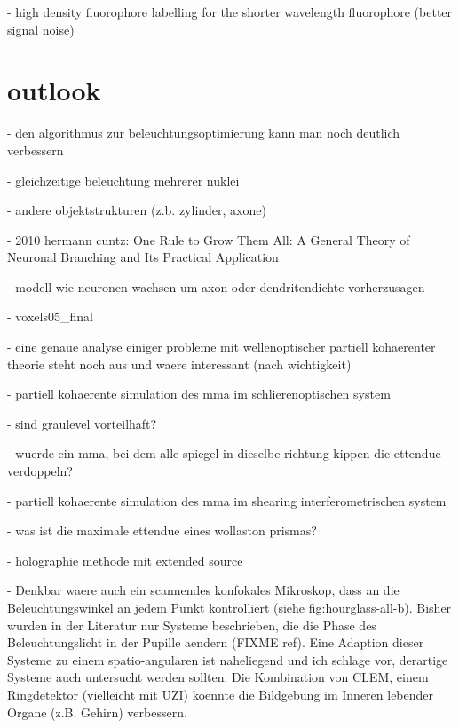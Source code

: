 \documentclass[oneside,a4paper,12pt,BCOR20mm,DIV14]{scrbook} %
\begin{document}
  - high density fluorophore labelling for the shorter wavelength
  fluorophore (better signal noise)

\chapter{outlook}
\label{sec:outlook}
- den algorithmus zur beleuchtungsoptimierung kann man noch deutlich
  verbessern

  - gleichzeitige beleuchtung mehrerer nuklei

  - andere objektstrukturen (z.b. zylinder, axone)

    - 2010 hermann cuntz: One Rule to Grow Them All: A General Theory
      of Neuronal Branching and Its Practical Application

      - modell wie neuronen wachsen um axon oder dendritendichte
        vorherzusagen

  - voxels05\_final

- eine genaue analyse einiger probleme mit wellenoptischer partiell
  kohaerenter theorie steht noch aus und waere interessant (nach
  wichtigkeit)

  - partiell kohaerente simulation des mma im schlierenoptischen system

    - sind graulevel vorteilhaft?

    - wuerde ein mma, bei dem alle spiegel in dieselbe richtung kippen
      die ettendue verdoppeln?

  - partiell kohaerente simulation des mma im shearing
    interferometrischen system

    - was ist die maximale ettendue eines wollaston prismas?

  - holographie methode mit extended source

  - Denkbar waere auch ein scannendes konfokales Mikroskop, dass an
    die Beleuchtungswinkel an jedem Punkt kontrolliert (siehe
    fig:hourglass-all-b).  Bisher wurden in der Literatur nur Systeme
    beschrieben, die die Phase des Beleuchtungslicht in der Pupille
    aendern (FIXME ref). Eine Adaption dieser Systeme zu einem
    spatio-angularen ist naheliegend und ich schlage vor, derartige
    Systeme auch untersucht werden sollten. Die Kombination von CLEM,
    einem Ringdetektor (vielleicht mit UZI) koennte die Bildgebung im
    Inneren lebender Organe (z.B. Gehirn) verbessern.

\appendix



%
\end{document}
